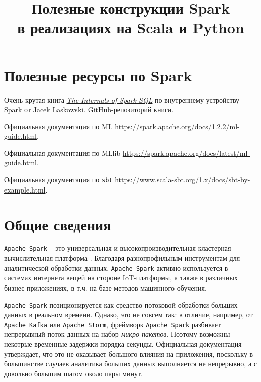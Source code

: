 \documentclass[%
	11pt,
	a4paper,
	utf8,
		]{article}
\begin{document}
\title{Полезные конструкции Spark\\в реализациях на Scala и Python}

\author{}

\date{}
\maketitle

\thispagestyle{fancy}

\tableofcontents


\section{Полезные ресурсы по Spark}

Очень крутая книга \href{https://the-internals-of-spark-sql.readthedocs.io/connector/SupportsRead/}{\textit{The Internals of Spark SQL}} по внутреннему устройству Spark от Jacek Laskowski. GitHub-репозиторий \href{https://github.com/jaceklaskowski/mastering-spark-sql-book}{книги}.

Официальная документация по ML \url{https://spark.apache.org/docs/1.2.2/ml-guide.html}.

Официальная документация по MLlib \url{https://spark.apache.org/docs/latest/ml-guide.html}.

Официальная документация по \texttt{sbt} \url{https://www.scala-sbt.org/1.x/docs/sbt-by-example.html}.


\section{Общие сведения}

\texttt{Apache Spark} -- это универсальная и высокопроизводительная кластерная вычислительная платформа \cite{carey:spark-2015}. Благодаря разнопрофильным инструментам для аналитической обработки данных, \texttt{Apache Spark} активно используется в системах интернета вещей на стороне IoT-платформы, а также в различных бизнес-приложениях, в т.ч. на базе методов машинного обучения.

\texttt{Apache Spark} позиционируется как средство потоковой обработки больших данных в реальном времени. Однако, это не совсем так: в отличие, например, от \texttt{Apache Kafka} или \texttt{Apache Storm}, фреймворк \texttt{Apache Spark} разбивает непрерывный поток данных на набор \emph{микро-пакетов}. Поэтому возможны некотрые временные задержки порядка секунды. Официальная документация утверждает, что это не оказывает большого влияния на приложения, поскольку в большинстве случаев аналитика больших данных выполняется не непрерывно, а с довольно большим шагом около пары минут. 
\end{document}
